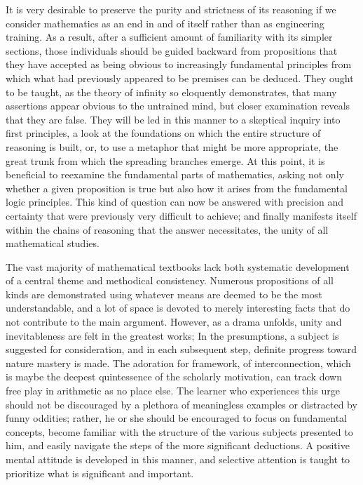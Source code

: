 \documentclass[a4paper,12pt]{book}[2004/02/16]
\theoremstyle{ilemma}
\theoremstyle{itheorem}
\theoremstyle{iother}
\theoremstyle{icorollary}
\theoremstyle{numcorollary}
\theoremstyle{idefinition}
\begin{document}
It is very desirable to preserve the purity and strictness of its reasoning if we consider mathematics as an end in and of itself rather than as engineering training. As a result, after a sufficient amount of familiarity with its simpler sections, those individuals should be guided backward from propositions that they have accepted as being obvious to increasingly fundamental principles from which what had previously appeared to be premises can be deduced. They ought to be taught, as the theory of infinity so eloquently demonstrates, that many assertions appear obvious to the untrained mind, but closer examination reveals that they are false. They will be led in this manner to a skeptical inquiry into first principles, a look at the foundations on which the entire structure of reasoning is built, or, to use a metaphor that might be more appropriate, the great trunk from which the spreading branches emerge. At this point, it is beneficial to reexamine the fundamental parts of mathematics, asking not only whether a given proposition is true but also how it arises from the fundamental logic principles. This kind of question can now be answered with precision and certainty that were previously very difficult to achieve; and finally manifests itself within the chains of reasoning that the answer necessitates, the unity of all mathematical studies.

The vast majority of mathematical textbooks lack both systematic development of a central theme and methodical consistency.
Numerous propositions of all kinds are demonstrated using whatever means are deemed to be the most understandable, and a lot of space is devoted to merely interesting facts that do not contribute to the main argument. However, as a drama unfolds, unity and inevitableness are felt in the greatest works; In the presumptions, a subject is suggested for consideration, and in each subsequent step, definite progress toward nature mastery is made. The adoration for framework, of
interconnection, which is maybe the deepest quintessence of the
scholarly motivation, can track down free play in arithmetic as no place
else. The learner who experiences this urge should not be discouraged by a plethora of meaningless examples or distracted by funny oddities; rather, he or she should be encouraged to focus on fundamental concepts, become familiar with the structure of the various subjects presented to him, and easily navigate the steps of the more significant deductions. A positive mental attitude is developed in this manner, and selective attention is taught to prioritize what is significant and important.
\end{document}
